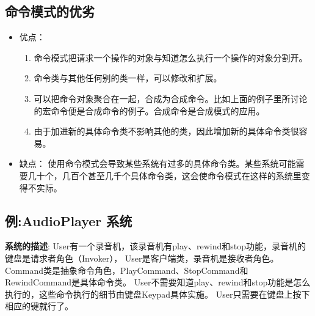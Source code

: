 \documentclass[../main.tex]{subfiles}
\begin{document}
\subsection{命令模式的优劣}
\begin{itemize}
  \item 优点：
    \begin{enumerate}
      \item 命令模式把请求一个操作的对象与知道怎么执行一个操作的对象分割开。
      \item 命令类与其他任何别的类一样，可以修改和扩展。
      \item 可以把命令对象聚合在一起，合成为合成命令。比如上面的例子里所讨论的宏命令便是合成命令的例子。合成命令是合成模式的应用。
      \item 由于加进新的具体命令类不影响其他的类，因此增加新的具体命令类很容易。
    \end{enumerate}
  \item 缺点：
    使用命令模式会导致某些系统有过多的具体命令类。某些系统可能需要几十个，几百个甚至几千个具体命令类，这会使命令模式在这样的系统里变得不实际。
\end{itemize}
%
\subsection{例:AudioPlayer 系统}
\noindent \textbf{系统的描述}:
User有一个录音机，该录音机有play、rewind和stop功能，录音机的键盘是请求者角色（Invoker）， User是客户端类，录音机是接收者角色。Command类是抽象命令角色，PlayCommand、StopCommand和RewindCommand是具体命令类。
User不需要知道play、rewind和stop功能是怎么执行的，这些命令执行的细节由键盘Keypad具体实施。
User只需要在键盘上按下相应的键就行了。
\end{document}
